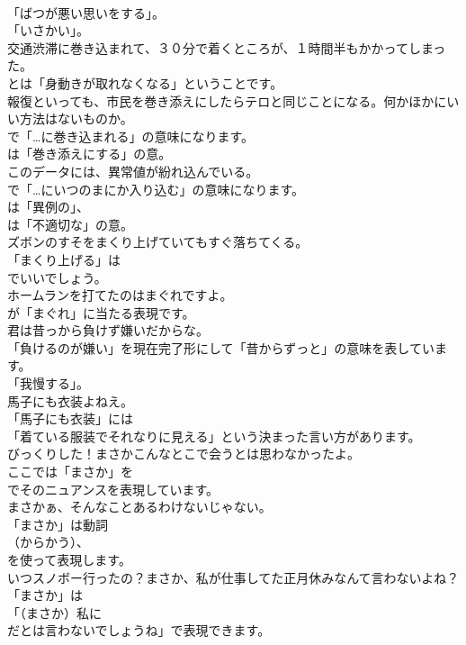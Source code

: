 \documentclass[8pt]{extreport}
\begin{document}
\begin{CJK}{UTF8}{min}
\\	「ばつが悪い思いをする」。
\\	「いさかい」。	
\\	交通渋滞に巻き込まれて、３０分で着くところが、１時間半もかかってしまった。 
\\	とは「身動きが取れなくなる」ということです。	
\\	報復といっても、市民を巻き添えにしたらテロと同じことになる。何かほかにいい方法はないものか。 
\\	で「…に巻き込まれる」の意味になります。
\\	は「巻き添えにする」の意。	
\\	このデータには、異常値が紛れ込んでいる。 
\\	で「…にいつのまにか入り込む」の意味になります。
\\	は「異例の」、
\\	は「不適切な」の意。	
\\	ズボンのすそをまくり上げていてもすぐ落ちてくる。 
\\	「まくり上げる」は
\\	でいいでしょう。	
\\	ホームランを打てたのはまぐれですよ。 
\\	が「まぐれ」に当たる表現です。	
\\	君は昔っから負けず嫌いだからな。 
\\	「負けるのが嫌い」を現在完了形にして「昔からずっと」の意味を表しています。
\\	「我慢する」。	
\\	馬子にも衣装よねえ。 
\\	「馬子にも衣装」には
\\	「着ている服装でそれなりに見える」という決まった言い方があります。	
\\	びっくりした！まさかこんなとこで会うとは思わなかったよ。 
\\	ここでは「まさか」を
\\	でそのニュアンスを表現しています。	
\\	まさかぁ、そんなことあるわけないじゃない。 
\\	「まさか」は動詞 
\\	（からかう）、
\\	を使って表現します。	
\\	いつスノボー行ったの？まさか、私が仕事してた正月休みなんて言わないよね？ 
\\	「まさか」は
\\	「（まさか）私に 
\\	だとは言わないでしょうね」で表現できます。

\end{CJK}
\end{document}
